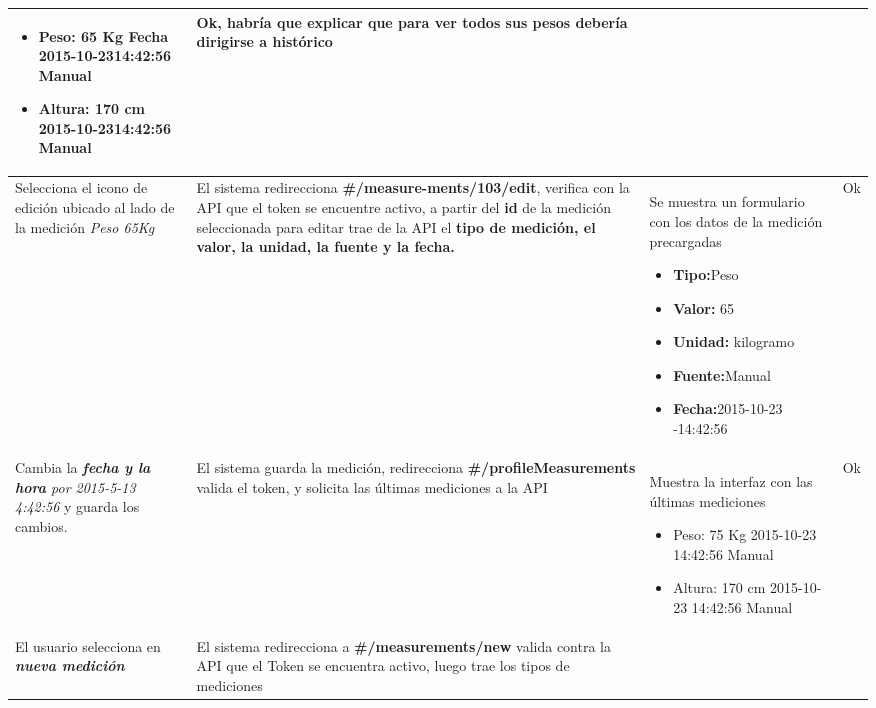 \begin{longtable}{|m{3.5cm}|m{3.5cm}|m{3.5cm}|m{2.5cm}|}
\begin{itemize}
	\item Peso: 65 Kg Fecha 2015-10-2314:42:56 Manual
	\item Altura: 170 cm 2015-10-2314:42:56 Manual

\end{itemize}
& Ok, habría que explicar que para ver todos sus pesos debería dirigirse a histórico

\\ \hline






Selecciona el icono de edición ubicado al lado de la medición \textit{Peso 65Kg}
& El sistema redirecciona \textbf{\#/measure-ments/103/edit}, verifica con la API que el token se encuentre activo, a partir del\textbf{ id} de la medición seleccionada para editar trae de la API el \textbf{tipo de medición, el valor, la unidad, la fuente y la fecha.}

& Se muestra un formulario con los datos de la medición precargadas
\begin{itemize}
	\item \textbf{Tipo:}Peso 
	\item \textbf{Valor: }65 
	\item \textbf{Unidad:} kilogramo
	\item \textbf{Fuente:}Manual 
	\item \textbf{Fecha:}2015-10-23 -14:42:56
\end{itemize}
&  Ok
\\ \hline





Cambia la \textit{\textbf{fecha y la hora} por 2015-5-13 4:42:56 }y guarda los cambios.
& El sistema guarda la medición, redirecciona\textbf{ \#/profileMeasurements }valida el token, y solicita las últimas mediciones a la API

& Muestra la interfaz con las últimas mediciones 
\begin{itemize}
	\item Peso: 75 Kg 2015-10-23 14:42:56 Manual 
	\item Altura: 170 cm 2015-10-23 14:42:56 Manual
\end{itemize}
& Ok
\\ \hline





El usuario selecciona en \textit{\textbf{nueva medición}}
& El sistema redirecciona a \textbf{\#/measurements/new} valida contra la API que el Token se encuentra activo, luego trae los tipos de mediciones


\end{longtable}
